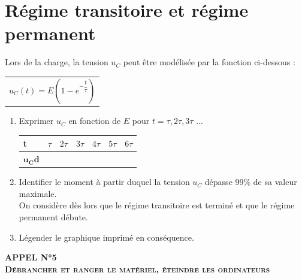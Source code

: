 \documentclass[a4paper,12pt,fleqn]{scrartcl}%
\begin{document}
\section{Régime transitoire et régime permanent}
Lors de la charge, la tension $u_C$ peut être modélisée par la fonction ci-dessous :\\
\begin{tabular}{>{\centering\arraybackslash}m{\linewidth}}
	$u_C(t) = E (1- e^{-\dfrac{t}{\tau}})$\\
\end{tabular}
	\begin{enumerate}[resume]
		\item Exprimer $u_C$ en fonction de $E$ pour $t=\tau, 2\tau, 3\tau$ ...\\
		\renewcommand{\arraystretch}{1.5}
		\begin{tabular}{|>{\centering}m{2cm}|>{\centering}m{2cm}|>{\centering}m{2cm}|>{\centering}m{2cm}|>{\centering}m{2cm}|>{\centering}m{2cm}|>{\centering\arraybackslash}m{2cm}|}
			\hline 
			\textbf{t} & $\tau$ & $2\tau$ & $3\tau$ & $4\tau$ & $5\tau$ & $6\tau$ \\
			\hline
			$\mathbf{u_Cd}$&&&&&&\\
			\hline 
		\end{tabular}
		\item Identifier le moment à partir duquel la tension $u_C$ dépasse 99\% de sa valeur maximale.\\
		On considère dès lors que le régime transitoire est terminé et que le régime permanent débute.
		\item Légender le graphique imprimé en conséquence.
	\end{enumerate}
\begin{center}
	\textbf{APPEL N°5}\\
	\vspace{1cm}
	\textbf{\textsc{Débrancher et ranger le matériel, éteindre les ordinateurs}}
\end{center}
\end{document}

